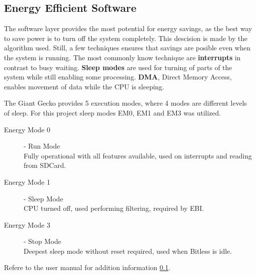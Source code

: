 \subsection{Energy Efficient Software}

The software layer provides the most potential for energy savings, as the best
way to save power is to turn off the system completely. This descision is made
by the algorithm used. Still, a few techniques ensures that savings are posible even when the system 
is running. The most commonly know technique are {\bf interrupts} in contrast to busy 
waiting. {\bf Sleep modes} are used for turning of parts of the system while still enabling 
some processing. {\bf DMA}, Direct Memory Access, enables movement of data while the
CPU is sleeping. 

The Giant Gecko provides 5 execution modes, where 4 modes are different levels of sleep. 
For this project sleep modes EM0, EM1 and EM3 was utilized.


\begin{description}
	\item[Energy Mode 0] - Run Mode \hfill \\
		Fully operational with all features available, used on interrupts and reading from SDCard.
	\item[Energy Mode 1] - Sleep Mode \hfill \\
		CPU turned off, used performing filtering, required by EBI.
	\item[Energy Mode 3] - Stop Mode \hfill \\
		Deepest sleep mode without reset required, used when Bitless is idle.
\end{description}
Refere to the user manual for addition information \ref{}.
